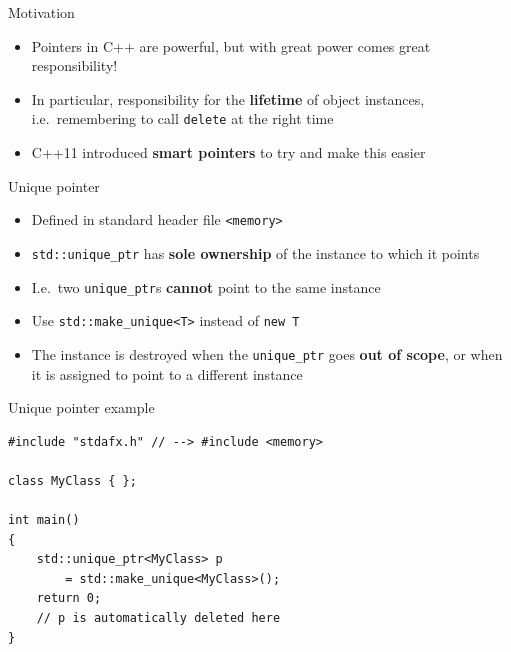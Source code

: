 
\begin{frame}{Motivation}
    \begin{itemize}
        \item Pointers in C++ are powerful, but with great power comes great responsibility!
        \item In particular, responsibility for the \textbf{lifetime} of object instances,
            i.e.\ remembering to call \lstinline{delete} at the right time
        \item C++11 introduced \textbf{smart pointers} to try and make this easier
    \end{itemize}
\end{frame}

\begin{frame}{Unique pointer}
    \begin{itemize}
        \item Defined in standard header file \lstinline{<memory>}
        \item \lstinline{std::unique_ptr} has \textbf{sole ownership} of the instance to which it points
        \item I.e.\ two \lstinline{unique_ptr}s \textbf{cannot} point to the same instance
        \item Use \lstinline{std::make_unique<T>} instead of \lstinline{new T}
        \item The instance is destroyed when the \lstinline{unique_ptr} goes \textbf{out of scope},
            or when it is assigned to point to a different instance
    \end{itemize}
\end{frame}

\begin{frame}[fragile]{Unique pointer example}
    \begin{lstlisting}
#include "stdafx.h" // --> #include <memory>

class MyClass { };

int main()
{
    std::unique_ptr<MyClass> p
        = std::make_unique<MyClass>();
    return 0;
    // p is automatically deleted here
}
    \end{lstlisting}
\end{frame}

